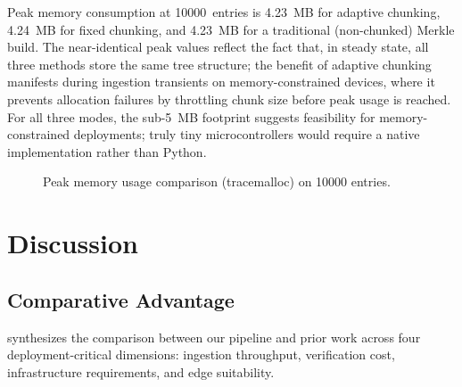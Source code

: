 \documentclass[preprint,12pt]{elsarticle}
\begin{document}
Peak memory consumption at \num{10000}~entries is \SI{4.23}{MB} for adaptive chunking, \SI{4.24}{MB} for fixed chunking, and \SI{4.23}{MB} for a traditional (non-chunked) Merkle build.
The near-identical peak values reflect the fact that, in steady state, all three methods store the same tree structure; the benefit of adaptive chunking manifests during ingestion transients on memory-constrained devices, where it prevents allocation failures by throttling chunk size before peak usage is reached.
For all three modes, the sub-\SI{5}{MB} footprint suggests feasibility for memory-constrained deployments; truly tiny microcontrollers would require a native implementation rather than Python.

\begin{figure}[t]
\centering
{}
\caption{Peak memory usage comparison (tracemalloc) on \num{10000} entries.}
\label{fig:memory}
\end{figure}

\section{Discussion}
\label{sec:discussion}

\subsection{Comparative Advantage}

 synthesizes the comparison between our pipeline and prior work across four deployment-critical dimensions: ingestion throughput, verification cost, infrastructure requirements, and edge suitability.
\end{document}
